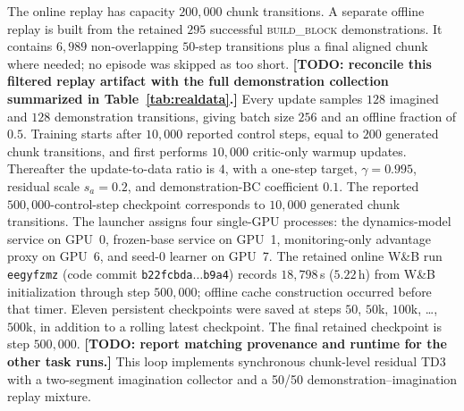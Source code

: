 \documentclass[letterpaper]{article} %
\newcommand{\todo}[1]{\textbf{[TODO: #1]}}
\begin{document}
The online replay has capacity $200{,}000$ chunk transitions. A separate offline
replay is built from the retained $295$ successful \textsc{build\_block}
demonstrations. It contains $6{,}989$ non-overlapping $50$-step transitions
plus a final aligned chunk where needed; no episode was skipped as too short.
\todo{reconcile this filtered replay artifact with the full demonstration
collection summarized in Table~\ref{tab:realdata}.}
Every update samples $128$ imagined and $128$ demonstration
transitions, giving batch size $256$ and an offline fraction of $0.5$. Training
starts after $10{,}000$ reported control steps, equal to $200$ generated chunk
transitions, and first performs $10{,}000$ critic-only warmup updates. Thereafter
the update-to-data ratio is $4$, with a one-step target, $\gamma=0.995$, residual
scale $s_a=0.2$, and demonstration-BC coefficient $0.1$. The reported
$500{,}000$-control-step checkpoint corresponds to $10{,}000$ generated chunk
transitions. The launcher assigns four single-GPU processes: the dynamics-model
service on GPU~0, frozen-base service on GPU~1, monitoring-only advantage proxy
on GPU~6, and seed-$0$ learner on GPU~7. The retained online W\&B run
\texttt{eegyfzmz} (code commit
\texttt{b22fcbda$\ldots$b9a4}) records $18{,}798$\,s
($5.22$\,h) from W\&B initialization through step $500{,}000$; offline cache
construction occurred before that timer. Eleven persistent checkpoints were
saved at steps $50$, $50$k, $100$k, \ldots, $500$k, in addition to a rolling
latest checkpoint. The final retained checkpoint is step $500{,}000$.
\todo{report matching provenance and runtime for the other task runs.}
This loop implements synchronous chunk-level residual TD3 with a two-segment
imagination collector and a 50/50 demonstration--imagination replay mixture.
\end{document}
